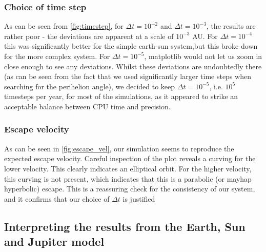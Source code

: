 \documentclass[a4paper, 10pt]{article}
\begin{document}
\subsubsection{Choice of time step}
As can be seen from \cref{fig:timestep}, for $\Delta t=10^{-2}$ and $\Delta t= 10^{-3}$, the results are rather poor - the deviations are apparent at a scale of $10^{-3}$ AU. For $\Delta t= 10^{-4}$ this was significantly better for the simple earth-sun system,but this broke down for the more complex system. For $\Delta t = 10^{-5}$, matplotlib would not let us zoom in close enough to see any deviations. Whilst these deviations are undoubtedly there (as can be seen from the fact that we used significantly larger time steps when searching for the perihelion angle), we decided to keep $\Delta t = 10^{-5}$, i.e. $10^5$ timesteps per year, for most of the simulations, as it appeared to strike an acceptable balance between CPU time and precision.
\subsubsection{Escape velocity}
As can be seen in \cref{fig:escape_vel}, our simulation seems to reproduce the expected escape velocity. Careful inspection of the plot reveals a curving for the lower velocity. This clearly indicates an elliptical orbit. For the higher velocity, this curving is not present, which indicates that this is a parabolic (or mayhap hyperbolic) escape. This is a reassuring check for the consistency of our system, and it confirms that our choice of $\Delta t$ is justified
\subsection{Interpreting the results from the Earth, Sun and Jupiter model}
\end{document}
